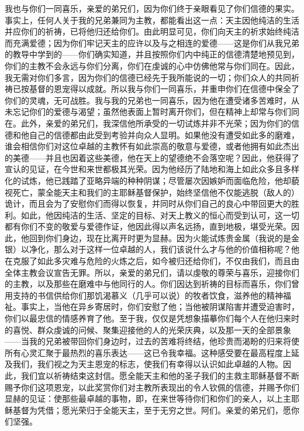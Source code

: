 我也与你们一同喜乐，亲爱的弟兄们，因为你们终于亲眼看见了你们信德的果实。事实上，任何人关于我的兄弟兼同为主教，都能看出这一点：天主因他纯洁的生活并应你们的祈祷，已将他归还给你们。由此明显可见，你们向天主的祈求始终纯洁而充满爱德；因为你们牢记天主的应许以及与之相连的爱德——这是你们从我兄弟的教导中学到的——你们确实知道，并且按照你们内中纯正的信德清楚地预见到，你们的主教不会永远与你们分离，你们在虔诚的心中仿佛他常与你们同在。因此，我无需对你们多言，因为你们的信德已经先于我所能说的一切；你们众人的共同祈祷已按基督的恩宠得以成就。所以我与你们一同喜乐，并重申你们在信德中保全了你们的灵魂，无可战胜。我与我的兄弟也一同喜乐，因为他在遭受诸多苦难时，从未忘记你们的爱德与渴望；虽然他表面上暂时离开你们，但在精神上却常与你们同在。此外，亲爱的弟兄们，我深信他所承受的一切试炼并非不光荣；因为你们的信德和他自己的信德都由此受到考验并向众人显明。如果他没有遭受如此多的磨难，谁会相信你们对这位卓越的主教怀有如此崇高的敬意与爱德，或者他拥有如此杰出的美德——并且也因着这些美德，他在天上的望德绝不会落空呢？因此，他获得了宣认的见证，在今世和来世都极其光荣。因为他经历了陆地和海上如此众多且多样化的试炼，他已践踏了亚略异端的种种阴谋；尽管屡次因嫉妒而面临危险，他却藐视死亡，蒙全能天主和我们的主耶稣基督保护，始终坚信他不仅能逃脱（敌人的）诡计，而且会为了安慰你们而得以恢复，并同时从你们自己的良心中带回更大的胜利。如此，他因纯洁的生活、坚定的目标、对天上教义的恒心而受到认可，这一切都有你们不变的敬爱与爱德作证，他因此得以声名远扬，直到地极，堪受光荣。因此，他回到你们身边，现在比离开时更为显赫。因为火能试炼贵金属（我说的是金银）以净化，那么对于这样一位卓越的人，我们该说什么才与他的价值相称呢？他在克服了如此多灾难与危险的火炼之后，如今被归还给你们，不仅由我们，而且由全体主教会议宣告无罪。所以，亲爱的弟兄们，请以虔敬的尊荣与喜乐，迎接你们的主教，以及那些在磨难中与他同行的人。你们因达到祈祷的目标而喜乐，你们曾用支持的书信供给你们那饥渴慕义（几乎可以说）的牧者饮食，滋养他的精神福祉。事实上，当他在异乡寄居时，你们安慰了他；当他被阴谋陷害并遭受迫害时，你们以最忠信的情感养育了他。至于我，仅仅是凭想象描摹你们每个人在他归来时的喜悦、群众虔诚的问候、聚集迎接他的人的光荣庆典，以及那一天的全部景象——当我的兄弟被带回你们身边时，过去的苦难将终结，他珍贵而渴盼的归来将使所有心灵汇聚于最热烈的喜乐表达——这已令我幸福。这种感受要在最高程度上延及我们，我们视之为天主恩宠的标志，使我们有幸得以认识如此卓越的人物。因此，我们宜以祈祷结束这封信。愿全能天主和他的圣子我们的主救主耶稣基督不断赐予你们这项恩宠，以此奖赏你们对主教所表现出的令人钦佩的信德，并赐予你们显赫的见证：使那些最卓越的事物，即，在来世等待你们和你们的亲人，以上主耶稣基督为凭借；愿光荣归于全能天主，至于无穷之世。阿们。亲爱的弟兄们，愿你们坚强。\par

